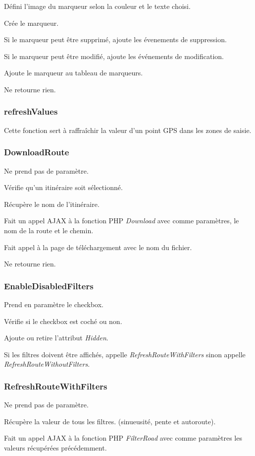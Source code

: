 \documentclass[a4paper]{article}
\begin{document}
Défini l'image du marqueur selon la couleur et le texte choisi.

Crée le marqueur.

Si le marqueur peut être supprimé, ajoute les évenements de suppression.

Si le marqueur peut être modifié, ajoute les événements de modification.

Ajoute le marqueur au tableau de marqueurs.

Ne retourne rien.

\subsubsection{refreshValues}
Cette fonction sert à raffraîchir la valeur d'un point GPS dans les zones de saisie.

\subsubsection{DownloadRoute}
Ne prend pas de paramètre.

Vérifie qu'un itinéraire soit sélectionné.

Récupère le nom de l'itinéraire.

Fait un appel AJAX à la fonction PHP \emph{Download} avec comme paramètres, le nom de la route et le chemin.

Fait appel à la page de téléchargement avec le nom du fichier.

Ne retourne rien.

\subsubsection{EnableDisabledFilters}
Prend en paramètre le checkbox.

Vérifie si le checkbox est coché ou non.

Ajoute ou retire l'attribut \emph{Hidden}.

Si les filtres doivent être affichés, appelle \emph{RefreshRouteWithFilters} sinon appelle \emph{RefreshRouteWithoutFilters}.

\subsubsection{RefreshRouteWithFilters}
Ne prend pas de paramètre.

Récupère la valeur de tous les filtres. (sinueusité, pente et autoroute).

Fait un appel AJAX à la fonction PHP \emph{FilterRoad} avec comme paramètres les valeurs récupérées précédemment.
\end{document}
